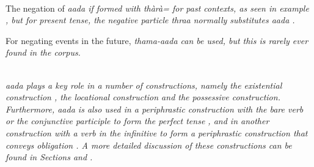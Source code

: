 \\


The negation of \em aada \em if formed with \em thàrà= \em for past contexts, as seen in example , but for present tense, the negative particle \em thraa \em normally substitutes \em aada \em {}.


For negating events in the future, \em thama-aada \em can be used, but this is rarely ever found in the corpus.


 \\
\em aada \em  plays a key role in a number of constructions, namely the existential construction , the locational construction  and the possessive construction. Furthermore, \em aada \em is also used in a periphrastic construction with the bare verb or the conjunctive participle to form the perfect tense , and in another construction with a verb in the infinitive to form a periphrastic construction that conveys obligation . A more detailed discussion of these constructions can be found in Sections  and .


\\



